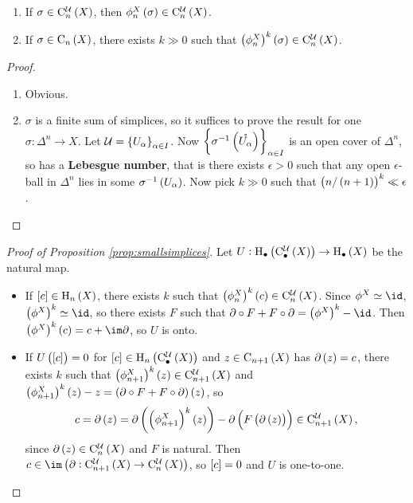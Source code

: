 \begin{corollary}
\hfill
\begin{enumerate}
\item If $ \sigma \in \C_n^\UUU\br{X} $, then $ \phi_n^X\br{\sigma} \in \C_n^\UUU\br{X} $.
\item If $ \sigma \in \C_n\br{X} $, there exists $ k \gg 0 $ such that $ \br{\phi_n^X}^k\br{\sigma} \in \C_n^\UUU\br{X} $.
\end{enumerate}
\end{corollary}

\begin{proof}
\hfill
\begin{enumerate}
\item Obvious.
\item $ \sigma $ is a finite sum of simplices, so it suffices to prove the result for one $ \sigma : \Delta^n \to X $. Let $ \UUU = \cbr{U_\alpha}_{\alpha \in I} $. Now $ \cbr{\sigma^{-1}\br{\mathring{U_\alpha}}}_{\alpha \in I} $ is an open cover of $ \Delta^n $, so has a \textbf{Lebesgue number}, that is there exists $ \epsilon > 0 $ such that any open $ \epsilon $-ball in $ \Delta^n $ lies in some $ \sigma^{-1}\br{U_\alpha} $. Now pick $ k \gg 0 $ such that $ \br{n / \br{n + 1}}^k \ll \epsilon $.
\end{enumerate}
\end{proof}

\begin{proof}[Proof of Proposition \ref{prop:smallsimplices}]
Let $ U : \H_\bullet\br{\C_\bullet^\UUU\br{X}} \to \H_\bullet\br{X} $ be the natural map.
\begin{itemize}
\item If $ \sbr{c} \in \H_n\br{X} $, there exists $ k $ such that $ \br{\phi_n^X}^k\br{c} \in \C_n^\UUU\br{X} $. Since $ \phi^X \simeq \id $, $ \br{\phi^X}^k \simeq \id $, so there exists $ F $ such that $ \da \circ F + F \circ \da = \br{\phi^X}^k - \id $. Then $ \br{\phi^X}^k\br{c} = c + \im \da $, so $ U $ is onto.
\item If $ U\br{\sbr{c}} = 0 $ for $ \sbr{c} \in \H_n\br{\C_\bullet^\UUU\br{X}} $ and $ z \in \C_{n + 1}\br{X} $ has $ \da\br{z} = c $, there exists $ k $ such that $ \br{\phi_{n + 1}^X}^k\br{z} \in \C_{n + 1}^\UUU\br{X} $ and $ \br{\phi_{n + 1}^X}^k\br{z} - z = \br{\da \circ F + F \circ \da}\br{z} $, so
$$ c = \da\br{z} = \da\br{\br{\phi_{n + 1}^X}^k\br{z}} - \da\br{F\br{\da\br{z}}} \in \C_{n + 1}^\UUU\br{X}, $$
since $ \da\br{z} \in \C_n^\UUU\br{X} $ and $ F $ is natural. Then $ c \in \im \br{\da : \C_{n + 1}^\UUU\br{X} \to \C_n^\UUU\br{X}} $, so $ \sbr{c} = 0 $ and $ U $ is one-to-one.
\end{itemize}
\end{proof}

